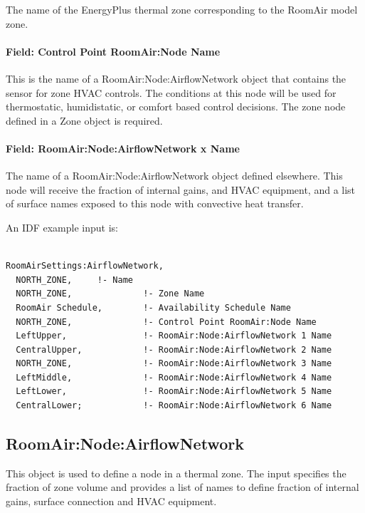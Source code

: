The name of the EnergyPlus thermal zone corresponding to the RoomAir model zone.

\paragraph{Field: Control Point RoomAir:Node Name}\label{field-control-point-roomairnode-name}

This is the name of a RoomAir:Node:AirflowNetwork object that contains the sensor for zone HVAC controls. The conditions at this node will be used for thermostatic, humidistatic, or comfort based control decisions. The zone node defined in a Zone object is required.

\paragraph{Field: RoomAir:Node:AirflowNetwork x Name}\label{field-roomairnodeairflownetwork-x-name}

The name of a RoomAir:Node:AirflowNetwork object defined elsewhere. This node will receive the fraction of internal gains, and HVAC equipment, and a list of surface names exposed to this node with convective heat transfer.

An IDF example input is:

\begin{lstlisting}

RoomAirSettings:AirflowNetwork,
  NORTH_ZONE,     !- Name 
  NORTH_ZONE,              !- Zone Name
  RoomAir Schedule,        !- Availability Schedule Name
  NORTH_ZONE,              !- Control Point RoomAir:Node Name
  LeftUpper,               !- RoomAir:Node:AirflowNetwork 1 Name
  CentralUpper,            !- RoomAir:Node:AirflowNetwork 2 Name
  NORTH_ZONE,              !- RoomAir:Node:AirflowNetwork 3 Name
  LeftMiddle,              !- RoomAir:Node:AirflowNetwork 4 Name
  LeftLower,               !- RoomAir:Node:AirflowNetwork 5 Name
  CentralLower;            !- RoomAir:Node:AirflowNetwork 6 Name
\end{lstlisting}

\subsection{RoomAir:Node:AirflowNetwork}\label{roomairnodeairflownetwork}

This object is used to define a node in a thermal zone. The input specifies the fraction of zone volume and provides a list of names to define fraction of internal gains, surface connection and HVAC equipment.


